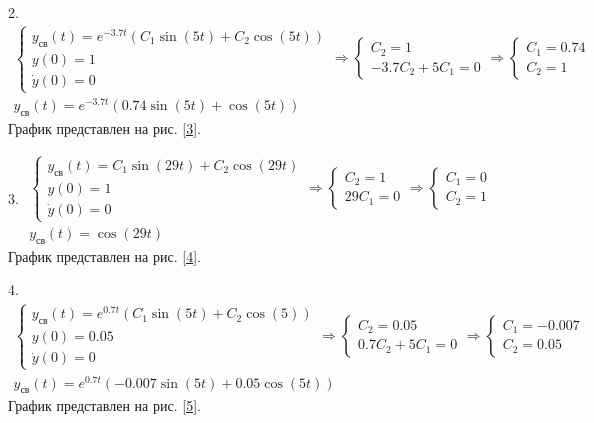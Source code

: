 2. $\begin{array}{l}
\left\lbrace \begin{array}{c}
y_{\textrm{св}} (t)=e^{-3.7t} (C_1 \sin (5t)+C_2 \cos (5t))\\
y(0)=1\\
\dot{y} (0)=0
\end{array}\right.\Rightarrow \left\lbrace \begin{array}{c}
C_2 =1\\
-3.7C_2 +5C_1 =0
\end{array}\right.\Rightarrow \left\lbrace \begin{array}{c}
C_1 =0.74\\
C_2 =1
\end{array}\right.\\
y_{\textrm{св}} (t)=e^{-3.7t} (0.74\sin (5t)+\cos (5t))
\end{array}$\\
График представлен на рис. \ref{3}.

\vspace{1em}

3. $\begin{array}{l}
\left\lbrace \begin{array}{c}
y_{св} (t)=C_1 \sin (29t)+C_2 \cos (29t)\\
y(0)=1\\
\dot{y} (0)=0
\end{array}\right.\Rightarrow \left\lbrace \begin{array}{c}
C_2 =1\\
29C_1 =0
\end{array}\right.\Rightarrow \left\lbrace \begin{array}{c}
C_1 =0\\
C_2 =1
\end{array}\right.\\
y_{\textrm{св}} (t)=\cos (29t)
\end{array}$\\
График представлен на рис. \ref{4}.

\vspace{1em}

4. $\begin{array}{l}
\left\lbrace \begin{array}{c}
y_{св} (t)=e^{0.7t} (C_1 \sin (5t)+C_2 \cos (5))\\
y(0)=0.05\\
\dot{y} (0)=0
\end{array}\right.\Rightarrow \left\lbrace \begin{array}{c}
C_2 =0.05\\
0.7C_2 +5C_1 =0
\end{array}\right.\Rightarrow \left\lbrace \begin{array}{c}
C_1 =-0.007\\
C_2 =0.05
\end{array}\right.\\
y_{\textrm{св}} (t)=e^{0.7t} (-0.007\sin (5t)+0.05\cos (5t))
\end{array}$\\
График представлен на рис. \ref{5}.

